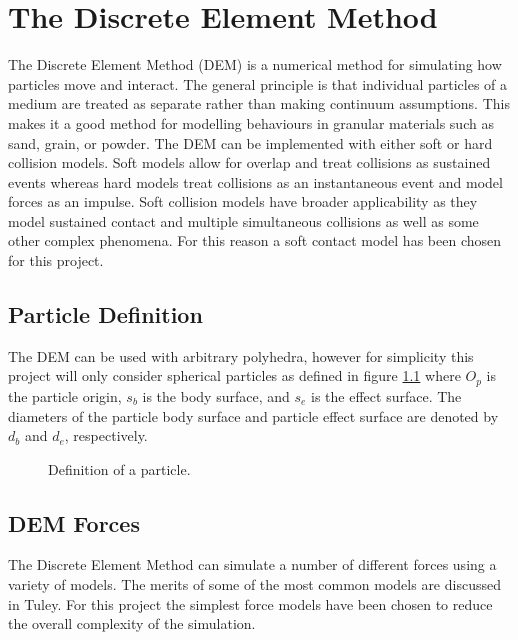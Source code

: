 \documentclass[10pt,a4paper,titlepage]{report}
\begin{document}
\chapter{The Discrete Element Method}
\label{ch:The Discrete Element Method}
The Discrete Element Method (DEM) is a numerical method for simulating how particles move and interact. The general principle is that individual particles of a medium are treated as separate rather than making continuum assumptions. This makes it a good method for modelling behaviours in granular materials such as sand, grain, or powder. The DEM can be implemented with either soft or hard collision models. Soft models allow for overlap and treat collisions as sustained events whereas hard models treat collisions as an instantaneous event and model forces as an impulse. Soft collision models have broader applicability as they model sustained contact and multiple simultaneous collisions as well as some other complex phenomena\cite{softvshard}. For this reason a soft contact model has been chosen for this project.
\section{Particle Definition}
The DEM can be used with arbitrary polyhedra, however for simplicity this project will only consider spherical particles as defined in figure \ref{fig:particle} where $O_p$ is the particle origin, $s_b$ is the body surface, and $s_e$ is the effect surface. The diameters of the particle body surface and particle effect surface are denoted by $d_b$ and $d_e$, respectively.
\begin{figure}[!ht]
\centering

\caption{Definition of a particle.}
\label{fig:particle}
\end{figure}
\section{DEM Forces}
\label{sec:DEM Forces}
The Discrete Element Method can simulate a number of different forces using a variety of models. The merits of some of the most common models are discussed in Tuley\cite{tuley}. For this project the simplest force models have been chosen to reduce the overall complexity of the simulation.
\end{document}
